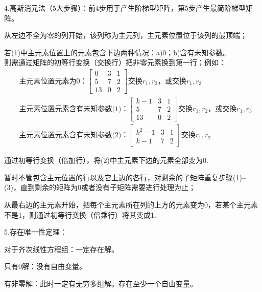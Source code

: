 \documentclass{article}
\begin{document}
4.\textcolor[rgb]{1.00,0.00,0.00}{高斯消元法}（5大步骤）：前4步用于产生阶梯型矩阵，第5步产生最简阶梯型矩阵。
\begin{asparaenum}[(1)]
\item 从左边不全为零的列开始，该列称为主元列，主元素位置位于该列的最顶端；
\item 若(1)中主元素位置上的元素包含下边两种情况：a)0；b)含有未知参数。\\
    则需通过矩阵的初等行变换（交换行）把非零元素换到第一行；例如：
    \begin{align*}
      &\text{主元素位置元素为0：}
      \begin{bmatrix}
        0 & 3 & 1 \\
        5 & 7 & 2 \\
        13 & 0 & 2
      \end{bmatrix}
      \text{交换$r_{1},r_{2}$，或交换$r_{1},r_{3}$}\\
      &\text{主元素位置元素含有未知参数(1)：}
      \begin{bmatrix}
        k-1 & 3 & 1 \\
        5 & 7 & 2 \\
        13 & 0 & 2
      \end{bmatrix}
      \text{交换$r_{1},r_{2}$，或交换$r_{1},r_{3}$}\\
      &\text{主元素位置元素含有未知参数(2)：}
      \begin{bmatrix}
        k^{2}-1 & 3 & 1 \\
        k-1 & 7 & 2 
      \end{bmatrix}
      \text{交换$r_{1},r_{2}$}
    \end{align*}
\item 通过初等行变换（倍加行），将(2)中主元素下边的元素全部变为0.
\item 暂时不管包含主元位置的行以及它上边的各行，对剩余的子矩阵重复步骤(1)\~{}(3)，直到剩余的矩阵为0或者没有子矩阵需要进行处理为止；
\item  从最右边的主元素开始，把每个主元素所在列的上方的元素变为0，若某个主元素不是1，则通过初等行变换（倍乘行）将其变成1.
\end{asparaenum}

5.\textcolor[rgb]{1.00,0.00,0.00}{存在唯一性定理}：

对于齐次线性方程组：一定存在解。
\begin{asparaenum}[(1)]
\item 只有0解：没有自由变量。
\item 有非零解：此时一定有无穷多组解。存在至少一个自由变量。
\end{asparaenum}
\end{document}
